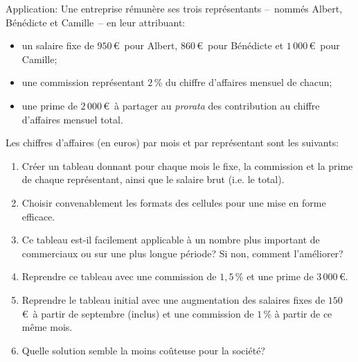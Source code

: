\documentclass[a4paper, 9pt]{article}
\begin{document}
  \exost Application:
  Une entreprise r\'emunère ses trois repr\'esentants --~nomm\'es Albert, B\'en\'edicte et Camille~-- en leur attribuant:
  \begin{itemize}
    \item un salaire fixe de $950$\,\euro{}\ pour Albert, $860$\,\euro{}\ pour B\'en\'edicte et $1\,000$\,\euro{}\ pour Camille;
    \item une commission repr\'esentant $2$\,\% du chiffre d'affaires mensuel de chacun;
    \item une prime de $2\,000$\,\euro{}\ à partager au \textit{prorata} des contribution au chiffre d'affaires mensuel total.
  \end{itemize}
  Les chiffres d'affaires (en euros) par mois et par repr\'esentant sont les suivants:
  \begin{center} %
  \end{center}
  \begin{enumerate}
    \item Cr\'eer un tableau donnant pour chaque mois le fixe, la commission et la prime de chaque repr\'esentant, ainsi que le salaire brut (i.e. le total).
    \item Choisir convenablement les formats des cellules pour une mise en forme efficace.
    \item Ce tableau est-il facilement applicable à un nombre plus important de commerciaux ou sur une plus longue p\'eriode? Si non, comment l'am\'eliorer?
    \item Reprendre ce tableau avec une commission de $1,5$\,\% et une prime de $3\,000$\,\euro{}.
    \item Reprendre le tableau initial avec une augmentation des salaires fixes de $150$\,\euro{}\ à partir de septembre (inclus) et une commission de $1$\,\% à partir de ce même mois.
    \item Quelle solution semble la moins coûteuse pour la soci\'et\'e?
  \end{enumerate}
\end{document}
